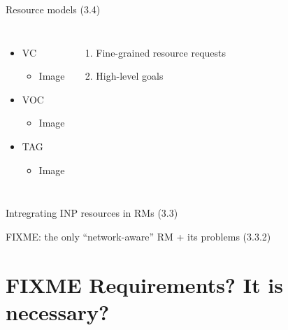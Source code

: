 \begin{frame}{Resource models (3.4)}
  \begin{columns}[T,onlytextwidth]
      \begin{itemize}
        \item VC
        \begin{itemize}
          \item Image
        \end{itemize}
        \item VOC
        \begin{itemize}
          \item Image
        \end{itemize}
        \item TAG
        \begin{itemize}
          \item Image
        \end{itemize}
      \end{itemize}

      \begin{enumerate}
        \item Fine-grained resource requests
        \item High-level goals
      \end{enumerate}
  \end{columns}
\end{frame}
\begin{frame}{Intregrating INP resources in RMs}
  (3.3)
\end{frame}
\begin{frame}{FIXME: the only “network-aware” RM + its problems}
  (3.3.2)
\end{frame}

\section{FIXME Requirements? It is necessary?}

